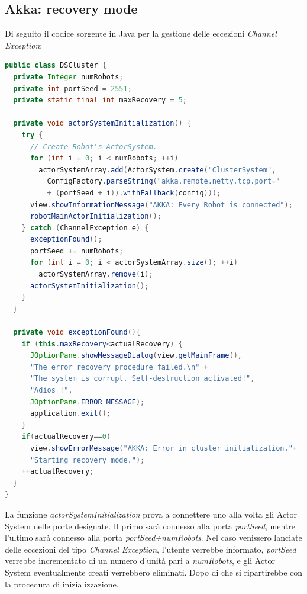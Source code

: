 \subsection{Akka: recovery mode}
\label{sec:akkarecovery}
Di seguito il codice sorgente in Java per la gestione delle eccezioni \emph{Channel Exception}:
\begin{lstlisting}[language=java]
public class DSCluster {
  private Integer numRobots;
  private int portSeed = 2551;
  private static final int maxRecovery = 5;
  
  private void actorSystemInitialization() {
    try {
      // Create Robot's ActorSystem.
      for (int i = 0; i < numRobots; ++i)
        actorSystemArray.add(ActorSystem.create("ClusterSystem",
          ConfigFactory.parseString("akka.remote.netty.tcp.port="
          + (portSeed + i)).withFallback(config)));
      view.showInformationMessage("AKKA: Every Robot is connected");
      robotMainActorInitialization();
    } catch (ChannelException e) {
      exceptionFound();
      portSeed += numRobots;
      for (int i = 0; i < actorSystemArray.size(); ++i) 
        actorSystemArray.remove(i);
      actorSystemInitialization();
    }
  }
  
  private void exceptionFound(){
    if (this.maxRecovery<actualRecovery) {
      JOptionPane.showMessageDialog(view.getMainFrame(),
      "The error recovery procedure failed.\n" +
      "The system is corrupt. Self-destruction activated!",
      "Adios !",
      JOptionPane.ERROR_MESSAGE);
      application.exit();
    }
    if(actualRecovery==0)
      view.showErrorMessage("AKKA: Error in cluster initialization."+
      "Starting recovery mode.");
    ++actualRecovery;
  }
}
\end{lstlisting}
La funzione \emph{actorSystemInitialization} prova a connettere uno alla volta gli Actor System nelle porte designate. Il primo sarà connesso alla porta \emph{portSeed}, mentre l'ultimo sarà connesso alla porta \emph{portSeed+numRobots}.
Nel caso venissero lanciate delle eccezioni del tipo \emph{Channel Exception}, l'utente verrebbe informato, \emph{portSeed} verrebbe incrementato di un numero d'unità pari a \emph{numRobots},  e gli Actor System eventualmente creati verrebbero eliminati. Dopo di che si ripartirebbe con la procedura di inizializzazione.
